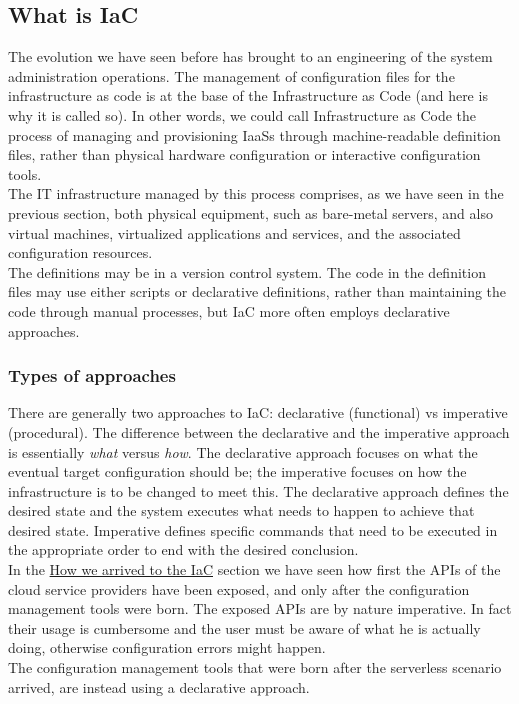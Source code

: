 \subsection{What is IaC}
The evolution we have seen before has brought to an engineering of the system administration operations.
The management of configuration files for the infrastructure as code is at the base of the Infrastructure as Code (and here is why it is called so).
In other words, we could call Infrastructure as Code the process of managing and provisioning \gls{IaaS}s through machine-readable definition files, rather than physical hardware configuration or interactive configuration tools. \\
The IT infrastructure managed by this process comprises, as we have seen in the previous section, both physical equipment, such as bare-metal servers, and also virtual machines, virtualized applications and services, and the associated configuration resources. \\
The definitions may be in a version control system. The code in the definition files may use either scripts or declarative definitions, rather than maintaining the code through manual processes, but IaC more often employs declarative approaches.


\subsubsection{Types of approaches}

There are generally two approaches to IaC: declarative (functional) vs imperative (procedural). The difference between the declarative and the imperative approach is essentially \textit{what} versus \textit{how}.
The declarative approach focuses on what the eventual target configuration should be; the imperative focuses on how the infrastructure is to be changed to meet this.
The declarative approach defines the desired state and the system executes what needs to happen to achieve that desired state.
Imperative defines specific commands that need to be executed in the appropriate order to end with the desired conclusion.\\
In the \hyperref[sec:story-iac]{How we arrived to the IaC} section we have seen how first the APIs of the cloud service providers have been exposed, and only after the configuration management tools were born.
The exposed APIs are by nature imperative. In fact their usage is cumbersome and the user must be aware of what he is actually doing, otherwise configuration errors might happen.\\
The configuration management tools that were born after the serverless scenario arrived, are instead using a declarative approach.

